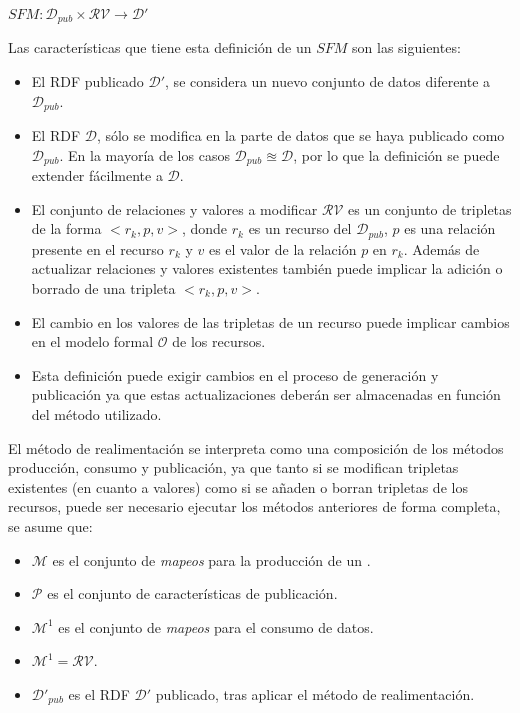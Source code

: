\begin{center}
    $SFM :  \mathcal{D}_{pub} \times \mathcal{RV} \longrightarrow \mathcal{D}'$
\end{center}
Las características que tiene esta definición de un $SFM$  son las siguientes:
\begin{itemize}
 \item El \dataset RDF publicado $\mathcal{D}'$, se considera un nuevo conjunto
de datos diferente a $\mathcal{D}_{pub}$.
 \item El \dataset RDF $\mathcal{D}$, sólo se modifica en la parte de datos
que se haya publicado como $\mathcal{D}_{pub}$. En la mayoría de los casos $\mathcal{D}_{pub} \approxeq \mathcal{D}$, por lo
que la definición se puede extender fácilmente a $\mathcal{D}$.
 \item El conjunto de relaciones y valores a modificar $\mathcal{RV}$ es un conjunto de tripletas
de la forma $<r_k,p,v>$, donde $r_k$ es un recurso del \dataset $\mathcal{D}_{pub}$, $p$ es una relación
presente en el recurso $r_k$ y $v$ es el valor de la relación $p$ en $r_k$. Además de actualizar
relaciones y valores existentes también puede implicar la adición o borrado de una tripleta $<r_k,p,v>$.
 \item El cambio en los valores de las tripletas de un recurso puede implicar cambios en el modelo
formal $\mathcal{O}$ de los recursos.
 \item Esta definición puede exigir cambios en el proceso de generación y publicación ya que estas 
actualizaciones deberán ser almacenadas en función del método utilizado.
 \end{itemize}

El método de realimentación se interpreta como una composición de los métodos producción, consumo y publicación, ya que 
tanto si se modifican tripletas existentes (en cuanto a valores) como si se añaden o borran tripletas de los recursos, 
puede ser necesario ejecutar los métodos anteriores de forma completa, se asume que:
\begin{itemize}
 \item $\mathcal{M}$ es el conjunto de \textit{mapeos} para la producción de un \dataset.
 \item $\mathcal{P}$ es el  conjunto de características de publicación.
 \item $\mathcal{M}^1$ es el conjunto de \textit{mapeos} para el consumo de datos.
 \item $\mathcal{M}^1 = \mathcal{RV} $.
 \item $\mathcal{D}'_{pub}$ es el \dataset RDF $\mathcal{D}'$ publicado, tras aplicar el método de realimentación.
\end{itemize}

